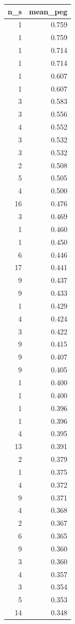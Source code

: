 \begin{tabular}{rr}
\toprule
n_s & mean_peg \\
\midrule
1 & 0.759 \\
1 & 0.759 \\
1 & 0.714 \\
1 & 0.714 \\
1 & 0.607 \\
1 & 0.607 \\
3 & 0.583 \\
3 & 0.556 \\
4 & 0.552 \\
3 & 0.532 \\
3 & 0.532 \\
2 & 0.508 \\
5 & 0.505 \\
4 & 0.500 \\
16 & 0.476 \\
3 & 0.469 \\
1 & 0.460 \\
1 & 0.450 \\
6 & 0.446 \\
17 & 0.441 \\
9 & 0.437 \\
9 & 0.433 \\
1 & 0.429 \\
4 & 0.424 \\
3 & 0.422 \\
9 & 0.415 \\
9 & 0.407 \\
9 & 0.405 \\
1 & 0.400 \\
1 & 0.400 \\
1 & 0.396 \\
1 & 0.396 \\
4 & 0.395 \\
13 & 0.391 \\
2 & 0.379 \\
1 & 0.375 \\
4 & 0.372 \\
9 & 0.371 \\
4 & 0.368 \\
2 & 0.367 \\
6 & 0.365 \\
9 & 0.360 \\
3 & 0.360 \\
4 & 0.357 \\
3 & 0.354 \\
5 & 0.353 \\
14 & 0.348 \\

\end{tabular}
